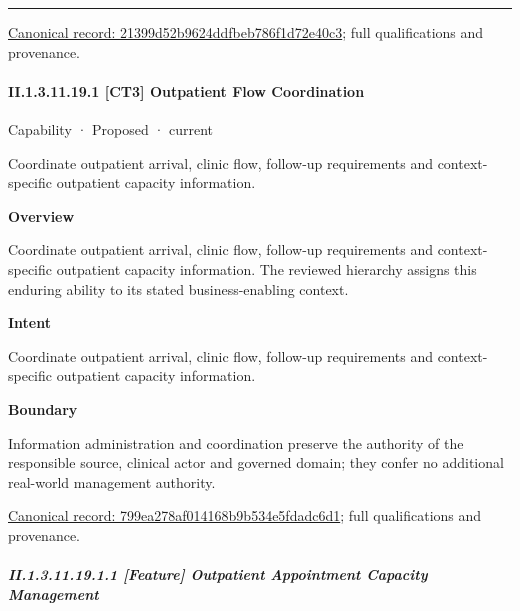 \medskip\hrule\medskip

{\footnotesize \href{../../../../continuum/strategy/capability/21399d52b9624ddfbeb786f1d72e40c3.md}{Canonical record: 21399d52b9624ddfbeb786f1d72e40c3}; full qualifications and provenance.}\par
\paragraph*{II.1.3.11.19.1 [CT3] Outpatient Flow Coordination}
\label{navigation:II.1.3.11.19.1}

\label{element:799ea278af014168b9b534e5fdadc6d1}
{\small Capability · Proposed · current}\par

Coordinate outpatient arrival, clinic flow, follow-up requirements and context-specific outpatient capacity information.



\textbf{Overview}



Coordinate outpatient arrival, clinic flow, follow-up requirements and context-specific outpatient capacity information. The reviewed hierarchy assigns this enduring ability to its stated business-enabling context.



\textbf{Intent}



Coordinate outpatient arrival, clinic flow, follow-up requirements and context-specific outpatient capacity information.



\textbf{Boundary}



Information administration and coordination preserve the authority of the responsible source, clinical actor and governed domain; they confer no additional real-world management authority.


{\footnotesize \href{../../../../continuum/strategy/capability/799ea278af014168b9b534e5fdadc6d1.md}{Canonical record: 799ea278af014168b9b534e5fdadc6d1}; full qualifications and provenance.}\par
\subparagraph*{II.1.3.11.19.1.1 [Feature] Outpatient Appointment Capacity Management}
\label{navigation:II.1.3.11.19.1.1}

